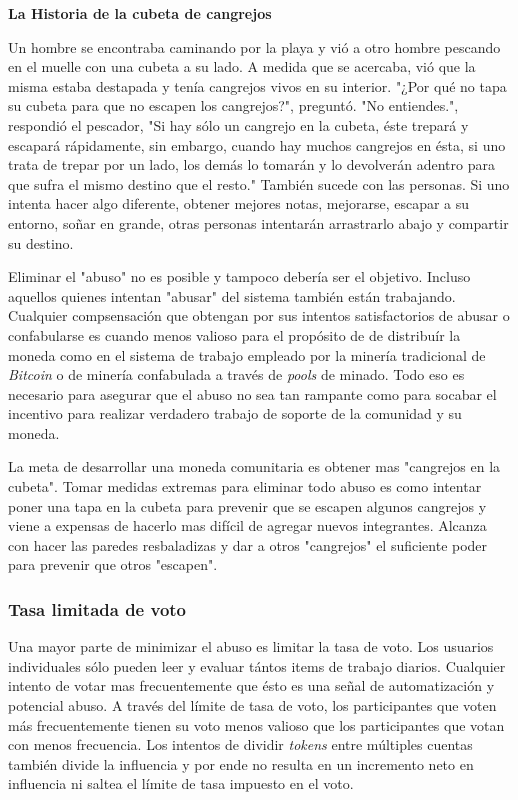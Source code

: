 \documentclass[a4paper,titlepage,final]{article}
\begin{document}
\begin{displayquote}
\textbf{La Historia de la cubeta de cangrejos}\cite{6}

Un hombre se encontraba caminando por la playa y vió a otro hombre pescando en el muelle con una cubeta a su lado. A medida que se acercaba, vió que la misma estaba destapada y tenía cangrejos vivos en su interior. "¿Por qué no tapa su cubeta para que no escapen los cangrejos?", preguntó. "No entiendes.", respondió el pescador, "Si hay sólo un cangrejo en la cubeta, éste trepará y escapará rápidamente, sin embargo, cuando hay muchos cangrejos en ésta, si uno trata de trepar por un lado, los demás lo tomarán y lo devolverán adentro para que sufra el mismo destino que el resto."
También sucede con las personas. Si uno intenta hacer algo diferente, obtener mejores notas, mejorarse, escapar a su entorno, soñar en grande, otras personas intentarán arrastrarlo abajo y compartir su destino.
\end{displayquote}

Eliminar el "abuso" no es posible y tampoco debería ser el objetivo. Incluso aquellos quienes intentan "abusar" del sistema también están trabajando. Cualquier compsensación que obtengan por sus intentos satisfactorios de abusar o confabularse es cuando menos valioso para el propósito de de distribuír la moneda como en el sistema de trabajo empleado por la minería tradicional de \textit{Bitcoin} o de minería confabulada a través de \textit{pools} de minado. Todo eso es necesario para asegurar que el abuso no sea tan rampante como para socabar el incentivo para realizar verdadero trabajo de soporte de la comunidad y su moneda.

La meta de desarrollar una moneda comunitaria es obtener mas "cangrejos en la cubeta". Tomar medidas extremas para eliminar todo abuso es como intentar poner una tapa en la cubeta para prevenir que se escapen algunos cangrejos y viene a expensas de hacerlo mas difícil de agregar nuevos integrantes. Alcanza con hacer las paredes resbaladizas y dar a otros "cangrejos" el suficiente poder para prevenir que otros "escapen".

\subsubsection{Tasa limitada de voto}

Una mayor parte de minimizar el abuso es limitar la tasa de voto. Los usuarios individuales sólo pueden leer y evaluar tántos items de trabajo diarios. Cualquier intento de votar mas frecuentemente que ésto es una señal de automatización y potencial abuso. A través del límite de tasa de voto, los participantes que voten más frecuentemente tienen su voto menos valioso que los participantes que votan con menos frecuencia. Los intentos de dividir \textit{tokens} entre múltiples cuentas también divide la influencia y por ende no resulta en un incremento neto en influencia ni saltea el límite de tasa impuesto en el voto.
\end{document}

